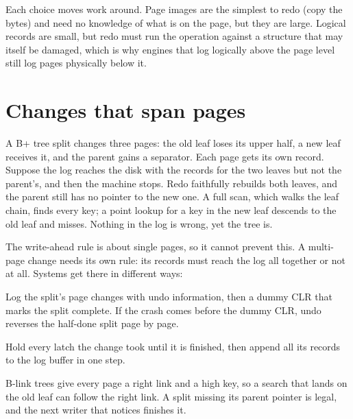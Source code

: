Each choice moves work around. Page images are the simplest to redo (copy the
bytes) and need no knowledge of what is on the page, but they are large.
Logical records are small, but redo must run the operation against a structure
that may itself be damaged, which is why engines that log logically above the
page level still log pages physically below it.

\section{Changes that span pages}

A B+ tree split changes three pages: the old leaf loses its upper half, a new
leaf receives it, and the parent gains a separator. Each page gets its own
record. Suppose the log reaches the disk with the records for the two leaves
but not the parent's, and then the machine stops. Redo faithfully rebuilds
both leaves, and the parent still has no pointer to the new one. A full scan,
which walks the leaf chain, finds every key; a point lookup for a key in the
new leaf descends to the old leaf and misses. Nothing in the log is wrong, yet
the tree is.

The write-ahead rule is about single pages, so it cannot prevent this. A
multi-page change needs its own rule: its records must reach the log all
together or not at all. Systems get there in different ways:

\begin{description}[leftmargin=1.2em]
\item[Nested top actions (ARIES).] Log the split's page changes with undo information, then a dummy CLR that marks the split complete. If the crash comes before the dummy CLR, undo reverses the half-done split page by page.
\item[Mini-transactions (InnoDB).] Hold every latch the change took until it is finished, then append all its records to the log buffer in one step.
\item[Tolerate the half state (PostgreSQL).] B-link trees give every page a right link and a high key, so a search that lands on the old leaf can follow the right link. A split missing its parent pointer is legal, and the next writer that notices finishes it.
\end{description}

